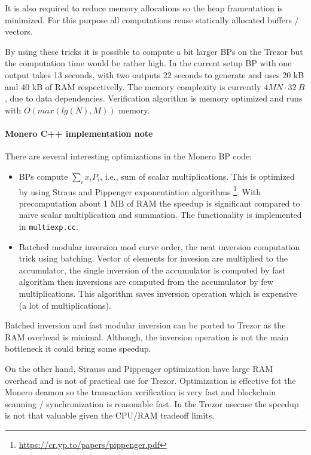 \documentclass[]{article}
\begin{document}
It is also required to reduce memory allocations so the heap framentation is minimized. For this purpose all computations reuse statically allocated buffers / vectors.

By using these tricks it is possible to compute a bit larger BPs on the Trezor but the computation time would be rather high. In the current setup BP with one output takes 13 seconds, with two outputs 22 seconds to generate and uses 20 kB and 40 kB of RAM respectivelly. The memory complexity is currently $4MN \cdot 32~B$, due to data dependencies. Verification algorithm is memory optimized and runs with $O(max(lg(N), M))$ memory.

\paragraph{Monero C++ implementation note} There are several interesting optimizations in the Monero BP code:
\begin{itemize}
	\item BPs compute $\sum_{i} x_iP_i$, i.e., sum of scalar multiplications. This is optimized by using Straus and Pippenger exponentiation algorithms \footnote{\url{https://cr.yp.to/papers/pippenger.pdf}}. With precomputation about 1 MB of RAM the speedup is significant compared to naive scalar multiplication and summation. The functionality is implemented in \verb|multiexp.cc|. 
	
	\item Batched modular inversion mod curve order, the neat inversion computation trick using batching. Vector of elements for invesion are multiplied to the accumulator, the single inversion of the accumulator is computed by fast algorithm then inversions are computed from the accumulator by few multiplications. This algorithm saves inversion operation which is expensive (a lot of multiplications). 
\end{itemize}

Batched inversion and fast modular inversion can be ported to Trezor as the RAM overhead is minimal. Although, the inversion operation is not the main bottleneck it could bring some speedup.

On the other hand, Strauss and Pippenger optimization have large RAM overhead and is not of practical use for Trezor. Optimization is effective fot the Monero deamon so the transaction verification is very fast and blockchain scanning / synchronization is reasonable fast. In the Trezor usecase the speedup is not that valuable given the CPU/RAM tradeoff limits.
\end{document}
